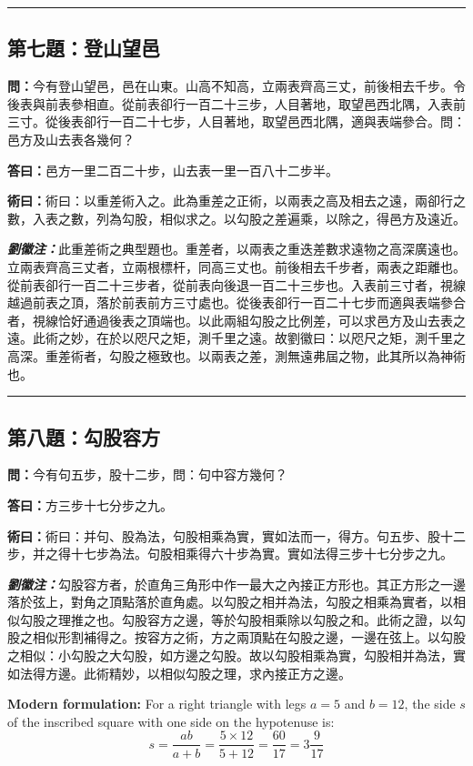 \documentclass[11pt,a4paper]{article}
\newcommand{\wen}[1]{\textbf{\color{problemcolor}問：}#1\par}
\newcommand{\da}[1]{\textbf{答曰：}#1\par}
\newcommand{\shu}[1]{\textbf{術曰：}#1\par}
\newcommand{\liuhui}[1]{{\color{commentarycolor}\textit{\textbf{劉徽注：}}#1\par}}
\begin{document}
\bigskip
\hrule
\bigskip

\subsection{第七題：登山望邑}

\wen{今有登山望邑，邑在山東。山高不知高，立兩表齊高三丈，前後相去千步。令後表與前表參相直。從前表卻行一百二十三步，人目著地，取望邑西北隅，入表前三寸。從後表卻行一百二十七步，人目著地，取望邑西北隅，適與表端參合。問：邑方及山去表各幾何？}

\da{邑方一里二百二十步，山去表一里一百八十二步半。}

\shu{術曰：以重差術入之。此為重差之正術，以兩表之高及相去之遠，兩卻行之數，入表之數，列為勾股，相似求之。以勾股之差遍乘，以除之，得邑方及遠近。}

\liuhui{此重差術之典型題也。重差者，以兩表之重迭差數求遠物之高深廣遠也。立兩表齊高三丈者，立兩根標杆，同高三丈也。前後相去千步者，兩表之距離也。從前表卻行一百二十三步者，從前表向後退一百二十三步也。入表前三寸者，視線越過前表之頂，落於前表前方三寸處也。從後表卻行一百二十七步而適與表端參合者，視線恰好通過後表之頂端也。以此兩組勾股之比例差，可以求邑方及山去表之遠。此術之妙，在於以咫尺之矩，測千里之遠。故劉徽曰：以咫尺之矩，測千里之高深。重差術者，勾股之極致也。以兩表之差，測無遠弗屆之物，此其所以為神術也。}

\bigskip
\hrule
\bigskip

\subsection{第八題：勾股容方}

\wen{今有句五步，股十二步，問：句中容方幾何？}

\da{方三步十七分步之九。}

\shu{術曰：并句、股為法，句股相乘為實，實如法而一，得方。句五步、股十二步，并之得十七步為法。句股相乘得六十步為實。實如法得三步十七分步之九。}

\liuhui{勾股容方者，於直角三角形中作一最大之內接正方形也。其正方形之一邊落於弦上，對角之頂點落於直角處。以勾股之相并為法，勾股之相乘為實者，以相似勾股之理推之也。勾股容方之邊，等於勾股相乘除以勾股之和。此術之證，以勾股之相似形割補得之。按容方之術，方之兩頂點在勾股之邊，一邊在弦上。以勾股之相似：小勾股之大勾股，如方邊之勾股。故以勾股相乘為實，勾股相并為法，實如法得方邊。此術精妙，以相似勾股之理，求內接正方之邊。}

\textbf{Modern formulation:} For a right triangle with legs $a = 5$ and $b = 12$, the side $s$ of the inscribed square with one side on the hypotenuse is:
\[s = \frac{ab}{a+b} = \frac{5 \times 12}{5 + 12} = \frac{60}{17} = 3\frac{9}{17}\]
\end{document}
